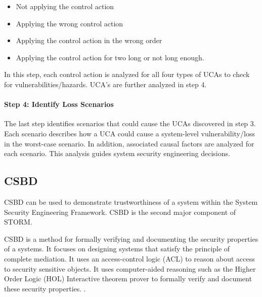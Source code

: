 \documentclass[../../main/main.tex]{subfiles}
\begin{document}
\begin{itemize}
\item Not applying the control action
\item Applying the wrong control action
\item Applying the control action in the wrong order
\item Applying the control action for two long or not long enough.
\end{itemize}

In this step, each control action is analyzed for all four types of UCAs to check for vulnerabilities/hazards.  UCA's are further analyzed in step 4.


\paragraph*{Step 4: Identify Loss Scenarios}
The last step identifies scenarios that could cause the UCAs discovered in step 3.  Each scenario describes how a UCA could cause a system-level vulnerability/loss in the worst-case scenario.  In addition, associated causal factors are analyzed for each scenario.  This analysis guides system security engineering decisions.


%
%
%
\subsection{CSBD}\label{ssec:csbd}

CSBD can be used to demonstrate trustworthiness of a system within the System Security Engineering Framework.  CSBD is the second major component of STORM.

CSBD is a method for formally verifying and documenting the security properties of a systems.  It focuses on designing systems that satisfy the principle of complete mediation.  It uses an access-control logic (ACL) to reason about access to security sensitive objects.  It uses computer-aided reasoning such as the Higher Order Logic (HOL) Interactive theorem prover to formally verify and document these security properties.  .
\end{document}
